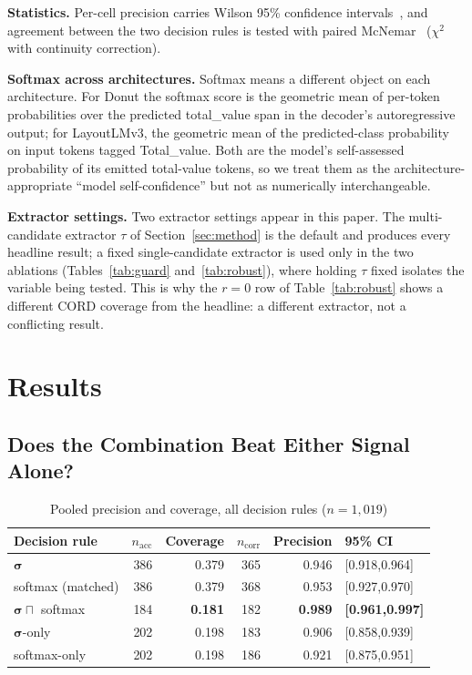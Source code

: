 \documentclass[conference]{IEEEtran}
\let\IEEEsigma\sigma
\DeclareRobustCommand{\sigma}{{\boldsymbol{\IEEEsigma}}}
\begin{document}
\noindent\textbf{Statistics.} Per-cell precision carries Wilson 95\% confidence
intervals~\cite{wilson1927ci}, and agreement
between the two decision rules is tested with paired
McNemar~\cite{mcnemar1947note} ($\chi^2$ with continuity correction).

\noindent\textbf{Softmax across architectures.} Softmax means a different object on each architecture. For Donut
the softmax score is the geometric mean of per-token probabilities
over the predicted total_value span in the decoder's
autoregressive output; for LayoutLMv3, the geometric mean of the
predicted-class probability on input tokens tagged Total_value. Both are the
model's self-assessed probability of its emitted total-value tokens, so we
treat them as the architecture-appropriate ``model self-confidence'' but not
as numerically interchangeable.

\noindent\textbf{Extractor settings.} Two extractor settings appear in this paper. The multi-candidate
extractor $\tau$ of Section~\ref{sec:method} is the default and produces every
headline result; a fixed single-candidate extractor is used only in the two
ablations (Tables~\ref{tab:guard} and~\ref{tab:robust}), where holding $\tau$
fixed isolates the variable being tested. This is why the $r{=}0$ row of
Table~\ref{tab:robust} shows a different CORD coverage from the headline: a
different extractor, not a conflicting result.

\section{Results}
\label{sec:results}

\subsection{Does the Combination Beat Either Signal Alone?}
\label{sec:results-headline}

\begin{table}[t]
\centering\small
\caption{Pooled precision and coverage, all decision rules ($n{=}1{,}019$)}
\label{tab:headline-pooled}
\setlength{\tabcolsep}{3pt}
\begin{tabular}{lrrrrl}
\toprule
Decision rule & $n_\text{acc}$ & Coverage & $n_\text{corr}$ & Precision & 95\% CI \\
\midrule
$\sigma$               & 386 & 0.379 & 365 & 0.946 & [0.918,0.964] \\
softmax (matched)      & 386 & 0.379 & 368 & 0.953 & [0.927,0.970] \\
$\sigma\sqcap$ softmax & 184 & \textbf{0.181} & 182 & \textbf{0.989} & \textbf{[0.961,0.997]} \\
$\sigma$-only          & 202 & 0.198 & 183 & 0.906 & [0.858,0.939] \\
softmax-only           & 202 & 0.198 & 186 & 0.921 & [0.875,0.951] \\
\bottomrule
\end{tabular}
\end{table}
\end{document}
